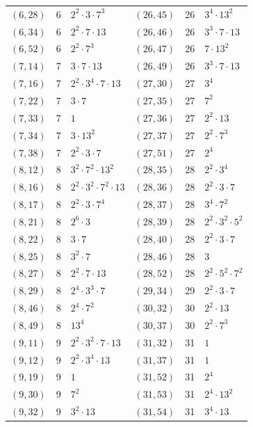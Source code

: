\documentclass[11pt]{article}
\begin{document}
\begin{longtable}{@{}lrl@{\qquad}lrl@{}}
$(6,28)$ & 6 & $2^{2}\cdot 3\cdot 7^{3}$ & $(26,45)$ & 26 & $3^{4}\cdot 13^{2}$\\
$(6,34)$ & 6 & $2^{2}\cdot 7\cdot 13$ & $(26,46)$ & 26 & $3^{3}\cdot 7\cdot 13$\\
$(6,52)$ & 6 & $2^{2}\cdot 7^{3}$ & $(26,47)$ & 26 & $7\cdot 13^{2}$\\
$(7,14)$ & 7 & $3\cdot 7\cdot 13$ & $(26,49)$ & 26 & $3^{3}\cdot 7\cdot 13$\\
$(7,16)$ & 7 & $2^{2}\cdot 3^{4}\cdot 7\cdot 13$ & $(27,30)$ & 27 & $3^{4}$\\
$(7,22)$ & 7 & $3\cdot 7$ & $(27,35)$ & 27 & $7^{2}$\\
$(7,33)$ & 7 & $1$ & $(27,36)$ & 27 & $2^{2}\cdot 13$\\
$(7,34)$ & 7 & $3\cdot 13^{2}$ & $(27,37)$ & 27 & $2^{2}\cdot 7^{3}$\\
$(7,38)$ & 7 & $2^{2}\cdot 3\cdot 7$ & $(27,51)$ & 27 & $2^{4}$\\
$(8,12)$ & 8 & $3^{2}\cdot 7^{2}\cdot 13^{2}$ & $(28,35)$ & 28 & $2^{2}\cdot 3^{4}$\\
$(8,16)$ & 8 & $2^{2}\cdot 3^{2}\cdot 7^{2}\cdot 13$ & $(28,36)$ & 28 & $2^{2}\cdot 3\cdot 7$\\
$(8,17)$ & 8 & $2^{2}\cdot 3\cdot 7^{4}$ & $(28,37)$ & 28 & $3^{4}\cdot 7^{2}$\\
$(8,21)$ & 8 & $2^{6}\cdot 3$ & $(28,39)$ & 28 & $2^{2}\cdot 3^{2}\cdot 5^{2}$\\
$(8,22)$ & 8 & $3\cdot 7$ & $(28,40)$ & 28 & $2^{2}\cdot 3\cdot 7$\\
$(8,25)$ & 8 & $3^{2}\cdot 7$ & $(28,46)$ & 28 & $3$\\
$(8,27)$ & 8 & $2^{2}\cdot 7\cdot 13$ & $(28,52)$ & 28 & $2^{2}\cdot 5^{2}\cdot 7^{2}$\\
$(8,29)$ & 8 & $2^{4}\cdot 3^{3}\cdot 7$ & $(29,34)$ & 29 & $2^{2}\cdot 3\cdot 7$\\
$(8,46)$ & 8 & $2^{4}\cdot 7^{2}$ & $(30,32)$ & 30 & $2^{2}\cdot 13$\\
$(8,49)$ & 8 & $13^{4}$ & $(30,37)$ & 30 & $2^{2}\cdot 7^{3}$\\
$(9,11)$ & 9 & $2^{2}\cdot 3^{2}\cdot 7\cdot 13$ & $(31,32)$ & 31 & $1$\\
$(9,12)$ & 9 & $2^{2}\cdot 3^{4}\cdot 13$ & $(31,37)$ & 31 & $1$\\
$(9,19)$ & 9 & $1$ & $(31,52)$ & 31 & $2^{4}$\\
$(9,30)$ & 9 & $7^{2}$ & $(31,53)$ & 31 & $2^{4}\cdot 13^{2}$\\
$(9,32)$ & 9 & $3^{2}\cdot 13$ & $(31,54)$ & 31 & $3^{4}\cdot 13$\\

\end{longtable}
\end{document}
